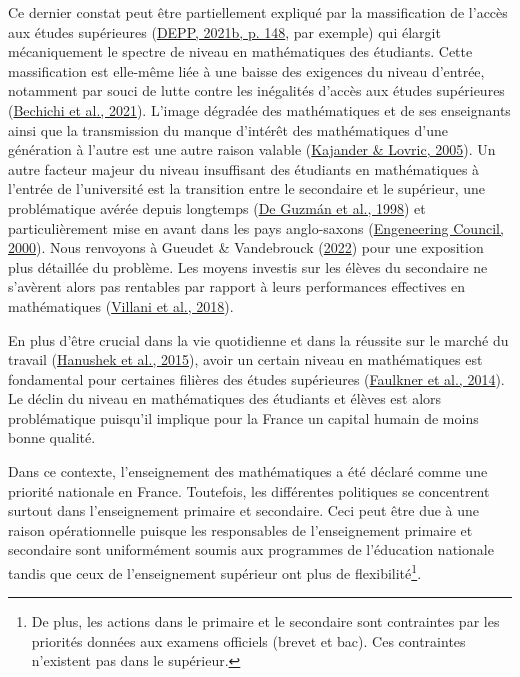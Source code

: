 \documentclass[
]{book}
\begin{document}
Ce dernier constat peut être partiellement expliqué par la massification de l'accès aux études supérieures (\protect\hyperlink{ref-DEP:21}{DEPP, 2021b, p. 148}, par exemple) qui élargit mécaniquement le spectre de niveau en mathématiques des étudiants. Cette massification est elle-même liée à une baisse des exigences du niveau d'entrée, notamment par souci de lutte contre les inégalités d'accès aux études supérieures (\protect\hyperlink{ref-BEC:eal:21}{Bechichi et al., 2021}). L'image dégradée des mathématiques et de ses enseignants ainsi que la transmission du manque d'intérêt des mathématiques d'une génération à l'autre est une autre raison valable (\protect\hyperlink{ref-KAJ:LOV:05}{Kajander \& Lovric, 2005}). Un autre facteur majeur du niveau insuffisant des étudiants en mathématiques à l'entrée de l'université est la transition entre le secondaire et le supérieur, une problématique avérée depuis longtemps (\protect\hyperlink{ref-DEG:98}{De Guzmán et al., 1998}) et particulièrement mise en avant dans les pays anglo-saxons (\protect\hyperlink{ref-ENG:00}{Engeneering Council, 2000}). Nous renvoyons à Gueudet \& Vandebrouck (\protect\hyperlink{ref-GUE:VAN:22}{2022}) pour une exposition plus détaillée du problème.
Les moyens investis sur les élèves du secondaire ne s'avèrent alors pas rentables par rapport à leurs performances effectives en mathématiques (\protect\hyperlink{ref-VIL:eal:18}{Villani et al., 2018}).

\quad En plus d'être crucial dans la vie quotidienne et dans la réussite sur le marché du travail (\protect\hyperlink{ref-HAN:eal:15}{Hanushek et al., 2015}), avoir un certain niveau en mathématiques est fondamental pour certaines filières des études supérieures (\protect\hyperlink{ref-FAUL:eal:14}{Faulkner et al., 2014}). Le déclin du niveau en mathématiques des étudiants et élèves est alors problématique puisqu'il implique pour la France un capital humain de moins bonne qualité.

\quad Dans ce contexte, l'enseignement des mathématiques a été déclaré comme une priorité nationale en France. Toutefois, les différentes politiques se concentrent surtout dans l'enseignement primaire et secondaire. Ceci peut être due à une raison opérationnelle puisque les responsables de l'enseignement primaire et secondaire sont uniformément soumis aux programmes de l'éducation nationale tandis que ceux de l'enseignement supérieur ont plus de flexibilité\footnote{De plus, les actions dans le primaire et le secondaire sont contraintes par les priorités données aux examens officiels (brevet et bac). Ces contraintes n'existent pas dans le supérieur.}.
\end{document}
